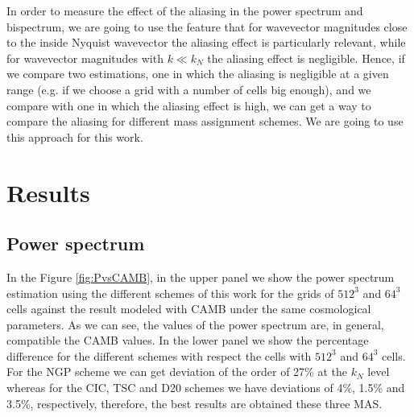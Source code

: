 \documentclass[a4paper,fleqn,usenatbib]{mnras}
\begin{document}

In order to measure the effect of the aliasing in the power spectrum and 
bispectrum, we are going to use the feature that for wavevector magnitudes 
close to the  inside Nyquist wavevector the aliasing effect is particularly 
relevant, while for wavevector magnitudes with $k\ll k_N$ the aliasing effect 
is negligible. Hence, if we compare two estimations, one in which the aliasing 
is negligible at a given range (e.g. if we choose a grid with a number 
of cells big enough), and we compare with one in which the aliasing effect is 
high, we can get a way to compare the aliasing for different mass assignment 
schemes. We are going to use this approach for this work.



\section{Results} 
\label{sec:results}

\subsection{Power spectrum}
\label{sec:results:pk}

In the Figure \ref{fig:PvsCAMB}, in the upper panel we show the power spectrum estimation using the 
different schemes of this work for the grids of $512^3$ and $64^3$ cells against the result modeled 
with CAMB under the same cosmological parameters. As we can see, the values of the power spectrum 
are, in general, compatible the CAMB values. In the lower panel we show the percentage difference 
for the different schemes with respect the cells with $512^3$ and $64^3$ cells. For the NGP 
scheme we can get deviation of the order of 27\% at the $k_N$ level whereas for the CIC, TSC and 
D20 schemes we have deviations of 4\%, 1.5\% and 3.5\%, respectively, therefore, the best results 
are obtained these three MAS. 
\end{document}

